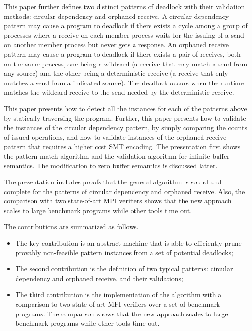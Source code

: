 This paper further defines two distinct patterns of deadlock with their validation methods: circular dependency and orphaned receive. A circular dependency pattern may cause a program to deadlock if there exists a cycle among a group of processes where a receive on each member process waits for the issuing of a send on another member process but never gets a response. An orphaned receive pattern may cause a program to deadlock if there exists a pair of receives, both on the same process, one being a wildcard (a receive that may match a send from any source) and the other being a deterministic receive (a receive that only matches a send from a indicated source). The deadlock occurs when the runtime matches the wildcard receive to the send needed by the deterministic receive. 

This paper presents how to detect all the instances for each of the patterns above by statically traversing the program. Further, this paper presents how to validate the instances of the circular dependency pattern, by simply comparing the counts of issued operations, and how to validate instances of the orphaned receive pattern that requires a higher cost SMT encoding. The presentation first shows the pattern match algorithm and the validation algorithm for infinite buffer semantics. The modification to zero buffer semantics is discussed latter.  

The presentation includes proofs that the general algorithm is sound and complete for the patterns of circular dependency and orphaned receive. Also, the comparison with two state-of-art MPI verifiers shows that the new approach scales to large benchmark programs while other tools time out.


The contributions are summarized as follows.
\begin{itemize}
\item The key contribution is an abstract machine that is able to efficiently prune provably non-feasible pattern instances from a set of potential deadlocks; 
\item The second contribution is the definition of two typical patterns: circular dependency and orphaned receive, and their validations;
\item The third contribution is the implementation of the algorithm with a comparison to two state-of-art MPI verifiers over a set of benchmark programs. The comparison shows that the new approach scales to large benchmark programs while other tools time out.
\end{itemize}

